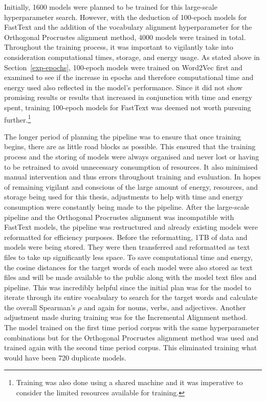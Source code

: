 Initially, 1600 models were planned to be trained for this large-scale hyperparameter search. However, with the deduction of 100-epoch models for FastText and the addition of the vocabulary alignment hyperparameter for the Orthogonal Procrustes alignment method, 4000 models were trained in total. Throughout the training process, it was important to vigilantly take into consideration computational times, storage, and energy usage. As stated above in Section~\ref{exp-epochs}, 100-epoch models were trained on Word2Vec first and examined to see if the increase in epochs and therefore computational time and energy used also reflected in the model’s performance. Since it did not show promising results or results that increased in conjunction with time and energy spent, training 100-epoch models for FastText was deemed not worth pursuing further.\footnote{Training was also done using a shared machine and it was imperative to consider the limited resources available for training.} 

The longer period of planning the pipeline was to ensure that once training begins, there are as little road blocks as possible. This ensured that the training process and the storing of models were always organised and never lost or having to be retrained to avoid unnecessary consumption of resources. It also minimised manual intervention and thus errors throughout training and evaluation. In hopes of remaining vigilant and conscious of the large amount of energy, resources, and storage being used for this thesis, adjustments to help with time and energy consumption were constantly being made to the pipeline. After the large-scale pipeline and the Orthogonal Procrustes alignment was incompatible with FastText models, the pipeline was restructured and already existing models were reformatted for efficiency purposes. Before the reformatting, 1TB of data and models were being stored. They were then transferred and reformatted as text files to take up significantly less space. To save computational time and energy, the cosine distances for the target words of each model were also stored as text files and will be made available to the public along with the model text files and pipeline. This was incredibly helpful since the initial plan was for the model to iterate through its entire vocabulary to search for the target words and calculate the overall Spearman’s $\rho$ and again for nouns, verbs, and adjectives. Another adjustment made during training was for the Incremental Alignment method. The model trained on the first time period corpus with the same hyperparameter combinations but for the Orthogonal Procrustes alignment method was used and trained again with the second time period corpus. This eliminated training what would have been 720 duplicate models.  

